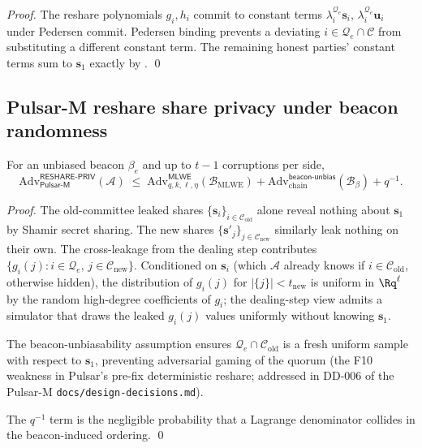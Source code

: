 \begin{proof}
The reshare polynomials $g_i, h_i$ commit to constant terms
$\lambda_i^{\mathcal{Q}_e} \mathbf{s}_i,\,
\lambda_i^{\mathcal{Q}_e} \mathbf{u}_i$ under Pedersen commit.
Pedersen binding prevents a deviating $i \in \mathcal{Q}_e \cap
\mathcal{C}$ from substituting a different constant term. The
remaining honest parties' constant terms sum to $\mathbf{s}_1$
exactly by . \qed
\end{proof}

\subsection*{Pulsar-M reshare share privacy under beacon randomness}

\begin{theorem}
\label{thm:pulsar-m-reshare-priv}
For an unbiased beacon $\beta_e$ and up to $t-1$ corruptions per
side,
\[
  \mathrm{Adv}^{\mathsf{RESHARE\text{-}PRIV}}_{\mathsf{Pulsar\text{-}M}}(\mathcal{A})
  \;\le\;
  \mathrm{Adv}^{\mathsf{MLWE}}_{q, k, \ell, \eta}(\mathcal{B}_{\mathrm{MLWE}})
  + \mathrm{Adv}^{\mathsf{beacon\text{-}unbias}}_{\mathrm{chain}}(\mathcal{B}_{\beta})
  + q^{-1}.
\]
\end{theorem}

\begin{proof}
The old-committee leaked shares $\{\mathbf{s}_i\}_{i \in
\mathcal{C}_{\mathrm{old}}}$ alone reveal nothing about
$\mathbf{s}_1$ by Shamir secret sharing. The new shares
$\{\mathbf{s}'_j\}_{j \in \mathcal{C}_{\mathrm{new}}}$ similarly
leak nothing on their own. The cross-leakage from the dealing step
contributes $\{g_i(j) : i \in \mathcal{Q}_e,\, j \in
\mathcal{C}_{\mathrm{new}}\}$. Conditioned on $\mathbf{s}_i$ (which
$\mathcal{A}$ already knows if $i \in \mathcal{C}_{\mathrm{old}}$,
otherwise hidden), the distribution of $g_i(j)$ for $|\{j\}| <
t_{\mathrm{new}}$ is uniform in $\Rq^\ell$ by the random high-degree
coefficients of $g_i$; the dealing-step view admits a simulator
that draws the leaked $g_i(j)$ values uniformly without knowing
$\mathbf{s}_1$.

The beacon-unbiasability assumption ensures
$\mathcal{Q}_e \cap \mathcal{C}_{\mathrm{old}}$ is a fresh uniform
sample with respect to $\mathbf{s}_1$, preventing adversarial
gaming of the quorum (the F10 weakness in Pulsar's pre-fix
deterministic reshare; addressed in DD-006 of the Pulsar-M
\texttt{docs/design-decisions.md}).

The $q^{-1}$ term is the negligible probability that a Lagrange
denominator collides in the beacon-induced ordering. \qed
\end{proof}

